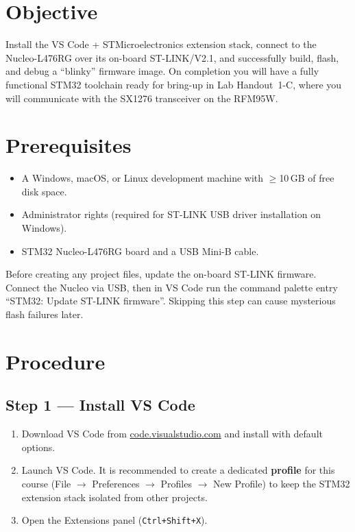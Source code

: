 \documentclass[11pt,letterpaper]{article}
\begin{document}

\section{Objective}
Install the VS Code + STMicroelectronics extension stack, connect to the Nucleo-L476RG over its on-board ST-LINK/V2.1, and successfully build, flash, and debug a ``blinky'' firmware image. On completion you will have a fully functional STM32 toolchain ready for \SPI{} bring-up in Lab Handout~1-C, where you will communicate with the SX1276 transceiver on the RFM95W.

\section{Prerequisites}
\begin{itemize}[leftmargin=2em]
	\item A Windows, macOS, or Linux development machine with $\geq$10\,GB of free disk space.
	\item Administrator rights (required for ST-LINK USB driver installation on Windows).
	\item STM32 Nucleo-L476RG board and a USB Mini-B cable.
\end{itemize}

\begin{tcolorbox}[warning={Before You Begin --- Update ST-LINK Firmware}]
	Before creating any project files, update the on-board ST-LINK firmware. Connect the Nucleo via USB, then in VS Code run the command palette entry ``STM32: Update ST-LINK firmware''. Skipping this step can cause mysterious flash failures later.
\end{tcolorbox}

\newpage
\section{Procedure}

\subsection{Step 1 --- Install VS Code}
\begin{enumerate}[leftmargin=2em]
	\item Download VS Code from \href{https://code.visualstudio.com/}{code.visualstudio.com} and install with default options.
	\item Launch VS Code. It is recommended to create a dedicated \textbf{profile} for this course (File $\to$ Preferences $\to$ Profiles $\to$ New Profile) to keep the STM32 extension stack isolated from other projects.
	\item Open the Extensions panel (\texttt{Ctrl+Shift+X}).
\end{enumerate}
\end{document}
